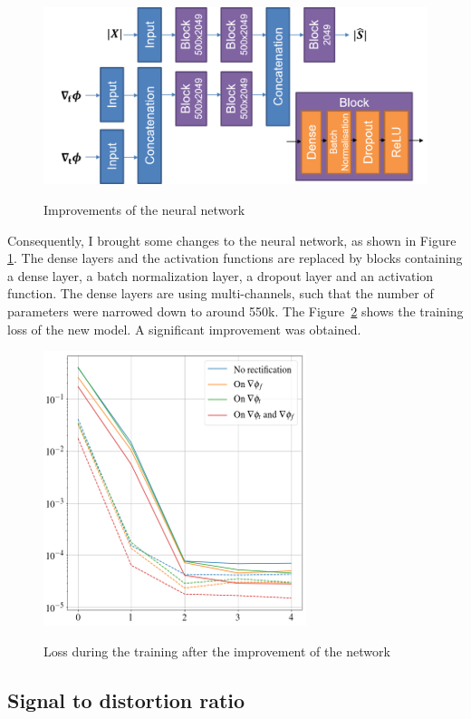 \begin{figure}
  \centering
  \includegraphics[width=0.9\columnwidth]{final-architecture.png}
  \label{fig:final-architecture}
  \caption{Improvements of the neural network}
\end{figure}

Consequently, I brought some changes to the neural network, as shown in Figure
\ref{fig:final-architecture}. The dense layers and the activation functions are
replaced by blocks containing a dense layer, a batch normalization layer,
 a dropout layer and an activation function.
The dense layers are using multi-channels, such that
the number of parameters were narrowed down to around 550k.
The Figure~\ref{fig:train-final} shows the training loss of the new model.
A significant improvement was obtained.

\begin{figure}
  \centering
  \includegraphics[width=0.6\columnwidth]{train-final.png}
  \label{fig:train-final}
  \caption{Loss during the training after the improvement of the network}
\end{figure}

\subsection{Signal to distortion ratio}

